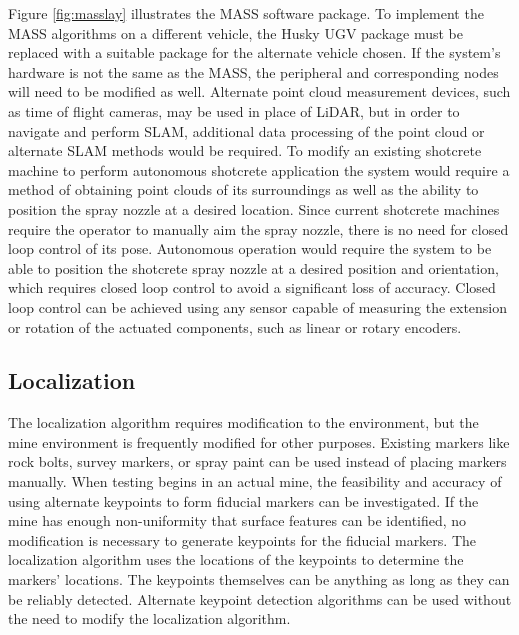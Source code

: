 Figure \ref{fig:masslay} illustrates the MASS software package. To implement the MASS algorithms on a different vehicle, the Husky UGV package must be replaced with a suitable package for the alternate vehicle chosen. If the system's hardware is not the same as the MASS, the peripheral and corresponding nodes will need to be modified as well. Alternate point cloud measurement devices, such as time of flight cameras, may be used in place of LiDAR, but in order to navigate and perform SLAM, additional data processing of the point cloud or alternate SLAM methods would be required. To modify an existing shotcrete machine to perform autonomous shotcrete application the system would require a method of obtaining point clouds of its surroundings as well as the ability to position the spray nozzle at a desired location. Since current shotcrete machines require the operator to manually aim the spray nozzle, there is no need for closed loop control of its pose. Autonomous operation would require the system to be able to position the shotcrete spray nozzle at a desired position and orientation, which requires closed loop control to avoid a significant loss of accuracy. Closed loop control can be achieved using any sensor capable of measuring the extension or rotation of the actuated components, such as linear or rotary encoders.\\

\subsection{Localization}

The localization algorithm requires modification to the environment, but the mine environment is frequently modified for other purposes. Existing markers like rock bolts, survey markers, or spray paint can be used instead of placing markers manually. When testing begins in an actual mine, the feasibility and accuracy of using alternate keypoints to form fiducial markers can be investigated. If the mine has enough non-uniformity that surface features can be identified, no modification is necessary to generate keypoints for the fiducial markers. The localization algorithm uses the locations of the keypoints to determine the markers' locations. The keypoints themselves can be anything as long as they can be reliably detected. Alternate keypoint detection algorithms can be used without the need to modify the localization algorithm.\\

